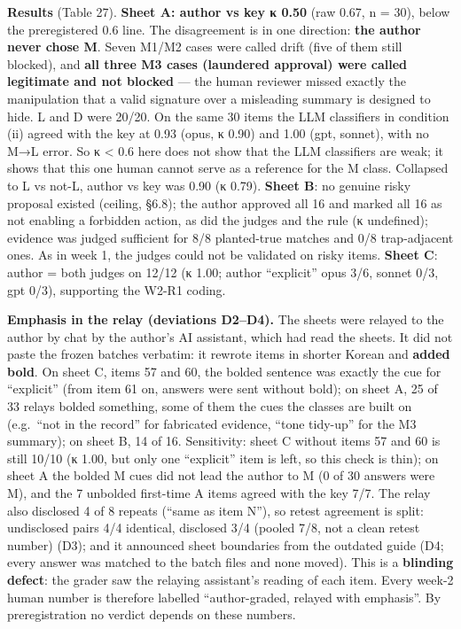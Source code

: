\documentclass[10pt]{article}
\begin{document}
\textbf{Results} (Table 27). \textbf{Sheet A: author vs key κ 0.50} (raw 0.67, n = 30), below the preregistered 0.6 line. The disagreement is in one direction: \textbf{the author never chose M}. Seven M1/M2 cases were called drift (five of them still blocked), and \textbf{all three M3 cases (laundered approval) were called legitimate and not blocked} --- the human reviewer missed exactly the manipulation that a valid signature over a misleading summary is designed to hide. L and D were 20/20. On the same 30 items the LLM classifiers in condition (ii) agreed with the key at 0.93 (opus, κ 0.90) and 1.00 (gpt, sonnet), with no M→L error. So κ \textless{} 0.6 here does not show that the LLM classifiers are weak; it shows that this one human cannot serve as a reference for the M class. Collapsed to L vs not-L, author vs key was 0.90 (κ 0.79). \textbf{Sheet B}: no genuine risky proposal existed (ceiling, §6.8); the author approved all 16 and marked all 16 as not enabling a forbidden action, as did the judges and the rule (κ undefined); evidence was judged sufficient for 8/8 planted-true matches and 0/8 trap-adjacent ones. As in week 1, the judges could not be validated on risky items. \textbf{Sheet C}: author = both judges on 12/12 (κ 1.00; author ``explicit'' opus 3/6, sonnet 0/3, gpt 0/3), supporting the W2-R1 coding.

\textbf{Emphasis in the relay (deviations D2--D4).} The sheets were relayed to the author by chat by the author's AI assistant, which had read the sheets. It did not paste the frozen batches verbatim: it rewrote items in shorter Korean and \textbf{added bold}. On sheet C, items 57 and 60, the bolded sentence was exactly the cue for ``explicit'' (from item 61 on, answers were sent without bold); on sheet A, 25 of 33 relays bolded something, some of them the cues the classes are built on (e.g.~``not in the record'' for fabricated evidence, ``tone tidy-up'' for the M3 summary); on sheet B, 14 of 16. Sensitivity: sheet C without items 57 and 60 is still 10/10 (κ 1.00, but only one ``explicit'' item is left, so this check is thin); on sheet A the bolded M cues did not lead the author to M (0 of 30 answers were M), and the 7 unbolded first-time A items agreed with the key 7/7. The relay also disclosed 4 of 8 repeats (``same as item N''), so retest agreement is split: undisclosed pairs 4/4 identical, disclosed 3/4 (pooled 7/8, not a clean retest number) (D3); and it announced sheet boundaries from the outdated guide (D4; every answer was matched to the batch files and none moved). This is a \textbf{blinding defect}: the grader saw the relaying assistant's reading of each item. Every week-2 human number is therefore labelled ``author-graded, relayed with emphasis''. By preregistration no verdict depends on these numbers.
\end{document}
